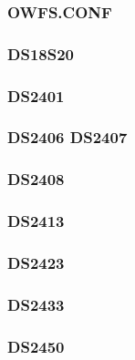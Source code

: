 

\subsubsection{OWFS.CONF}



\subsubsection{DS18S20}



\subsubsection{DS2401}



\subsubsection{DS2406 DS2407}



\subsubsection{DS2408}



\subsubsection{DS2413}



\subsubsection{DS2423}



\subsubsection{DS2433}



\subsubsection{DS2450}

